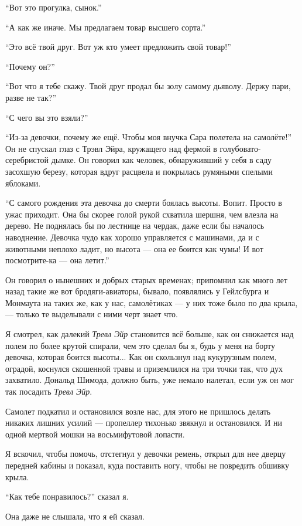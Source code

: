 ``Вот это прогулка, сынок.''

``А как же иначе. Мы предлагаем товар высшего сорта.''

``Это всё твой друг. Вот уж кто умеет предложить свой товар!''

``Почему он?''

``Вот что я тебе скажу. Твой друг продал бы золу самому дьяволу. Держу пари, разве не так?''

``С чего вы это взяли?''

``Из-за девочки, почему же ещё. Чтобы моя внучка Сара полетела на самолёте!'' Он не спускал
 глаз с Трэвл Эйра, кружащего над фермой в го\-лу\-бо\-ва\-то-се\-реб\-рис\-той дымке. Он говорил как человек, обнаруживший у себя в саду засохшую березу, которая вдруг расцвела и покрылась румяными спелыми яблоками.

``С самого рождения эта девочка до смерти боялась высоты. Вопит. Просто в ужас приходит. Она бы
 скорее голой рукой схватила шершня, чем влезла на дерево. Не поднялась бы по лестнице на чердак,
 даже если бы началось наводнение. Девочка чудо как хорошо управляется с машинами, да и с
 животными неплохо ладит, но высота --- она ее боится как чумы! И вот посмотрите-ка --- она летит.''

Он говорил о нынешних и добрых старых временах; припомнил как много лет назад такие же вот бродяги-авиаторы, бывало, появлялись у Гейлсбурга и Монмаута на таких же, как у нас, самолётиках --- у них тоже было по два крыла, --- только те выделывали с ними черт знает что.

Я смотрел, как далекий {\it Тревл Эйр\/} становится всё больше, как он снижается над полем по
более крутой спирали, чем это сделал бы я, будь у меня на борту девочка, которая боится высоты...
Как он скользнул над кукурузным полем, оградой, коснулся скошенной травы и приземлился на три
точки так, что дух захватило. Дональд Шимода, должно быть, уже немало налетал, если уж он мог так
посадить {\it Тревл Эйр}.

Самолет подкатил и остановился возле нас, для этого не пришлось делать никаких лишних усилий --- пропеллер тихонько звякнул и остановился. И ни одной мертвой мошки на восьмифутовой лопасти.

Я вскочил, чтобы помочь, отстегнул у девочки ремень, открыл для нее дверцу передней кабины и
 показал, куда поставить ногу, чтобы не повредить обшивку крыла.

``Как тебе понравилось?'' сказал я.

Она даже не слышала, что я ей сказал.

